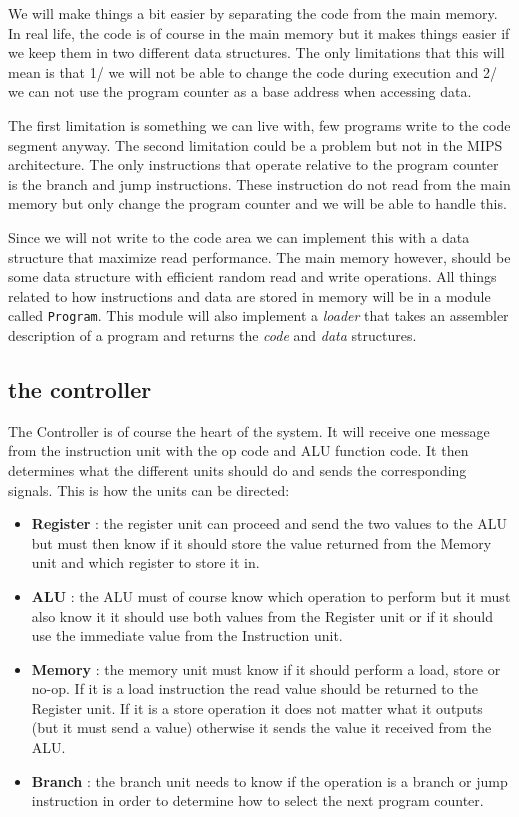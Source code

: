 \documentclass[a4paper,11pt]{article}
\begin{document}
We will make things a bit easier by separating the code from the main
memory. In real life, the code is of course in the main memory but it
makes things easier if we keep them in two different data
structures. The only limitations that this will mean is that 1/ we
will not be able to change the code during execution and 2/ we can not
use the program counter as a base address when accessing data.

The first limitation is something we can live with, few programs write
to the code segment anyway. The second limitation could be a problem but
not in the MIPS architecture. The only instructions that operate
relative to the program counter is the branch and jump
instructions. These instruction do not read from the main memory but
only change the program counter and we will be able to handle
this.

Since we will not write to the code area we can implement this with a
data structure that maximize read performance. The main memory
however, should be some data structure with efficient random read and
write operations. All things related to how instructions and data are
stored in memory will be in a module called {\tt Program}. This
module will also implement a {\em loader} that takes an assembler
description of a program and returns the {\em code} and {\em data}
structures.


\subsection*{the controller}

The Controller is of course the heart of the system. It will receive
one message from the instruction unit with the op code and ALU function
code. It then determines what the different units should do and sends
the corresponding signals. This is how the units can be directed:

\begin{itemize}

\item {\bf Register} : the register unit can proceed and send the two
  values to the ALU but must then know if it should store the value
  returned from the Memory unit and which register to store it in.

\item {\bf ALU} : the ALU must of course know which operation to
  perform but it must also know it it should use both values from the
  Register unit or if it should use the immediate value from the
  Instruction unit.

\item {\bf Memory} : the memory unit must know if it should perform a
  load, store or no-op. If it is a load instruction the read value
  should be returned to the Register unit. If it is a store operation
  it does not matter what it outputs (but it must send a value)
  otherwise it sends the value it received from the ALU.

\item {\bf Branch} : the branch unit needs to know if the operation is a
  branch or jump instruction in order to determine how to select the
  next program counter.
  
\end{itemize}
\end{document}

